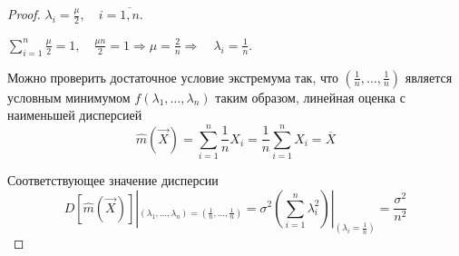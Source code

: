 \documentclass[a4paper, 12pt]{article}
\theoremstyle{definition}
\theoremstyle{leads}
\theoremstyle{example}
\begin{document}
\begin{proof}
$\lambda_i = \frac{\mu}{2}, \quad i = \overline{1, n}$.

$\sum_{i=1}^{n} \frac{\mu}{2} = 1,\quad \frac{\mu n }{2} = 1 \Longrightarrow  \mu = \frac{2}{n} \Longrightarrow \quad \lambda_i = \frac{1}{n}$.\newline

Можно проверить достаточное условие экстремума так, что 
$(\frac{1}{n}, \dots, \frac{1}{n})$ является условным минимумом $f(\lambda_1, \dots, \lambda_n)$ таким образом, линейная оценка с наименьшей дисперсией 
\begin{equation*}
	\hat{m}(\vec{X}) = \sum_{i=1}^{n}\frac{1}{n} X_i = \frac{1}{n} \sum_{i=1}^{n}X_i = \overline{X}
\end{equation*}

Соответствующее значение дисперсии
\begin{equation*}
	D[\hat{m}(\vec{X})]|_{(\lambda_1, \dots, \lambda_n) = (\frac{1}{n}, \dots, \frac{1}{n})} = \sigma^2(\sum_{i=1}^{n}\lambda_i^2)|_{(\lambda_i = \frac{1}{n})} = \frac{\sigma^2}{n^2}
\end{equation*}
\end{proof}
\end{document}
